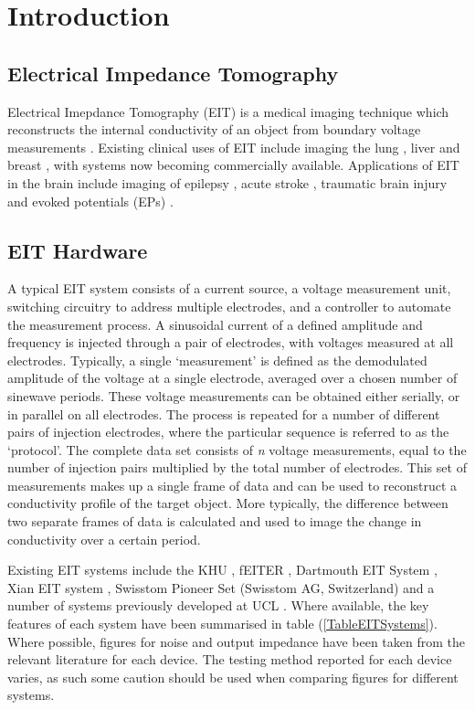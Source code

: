 \section{Introduction}

\subsection{Electrical Impedance Tomography}
Electrical Imepdance Tomography (EIT) is a medical imaging technique which reconstructs the internal conductivity of an object from boundary voltage measurements \cite{Metherall1996}. Existing clinical uses of EIT include imaging the lung \cite{Frerichs_2000}, liver \cite{YOU_2009} and breast \cite{Halter}, with systems now becoming commercially available. Applications of EIT in the brain include imaging of epilepsy \cite{Vongerichten_2016,Fabrizi_2006}, acute stroke \cite{Dowrick_2016}, traumatic brain injury \cite{Manwaring2013} and evoked potentials (EPs) \cite{Aristovich_2016}. 
\subsection{EIT Hardware}

A typical EIT system consists of a current source, a voltage measurement unit, switching circuitry to address multiple electrodes, and a controller to automate the measurement process. A sinusoidal current of a defined amplitude and frequency is injected through a pair of electrodes, with voltages measured at all electrodes. Typically, a single `measurement' is defined as the demodulated amplitude of the voltage at a single electrode, averaged over a chosen number of sinewave periods. These voltage measurements can be obtained either serially, or in parallel on all electrodes. The process is repeated for a number of different pairs of injection electrodes, where the particular sequence is referred to as the `protocol'. The complete data set consists of \emph{n} voltage measurements, equal to the number of injection pairs multiplied by the total number of electrodes. This set of measurements makes up a single frame of data and can be used to reconstruct a conductivity profile of the target object. More typically, the difference between two separate frames of data is calculated and used to image the change in conductivity over a certain period.

Existing EIT systems include the KHU \cite{Hun_Wi_2014}, fEITER \cite{McCann_2011}, Dartmouth EIT System \cite{khan}, Xian EIT system \cite{Shi_Xuetao_2005}, Swisstom Pioneer Set (Swisstom AG, Switzerland) and a number of systems previously developed at UCL \cite{Oh2011} \cite{McEwan_2006}. Where available, the key features of each system have been summarised in table (\ref{TableEITSystems}). Where possible, 
figures for noise and output impedance have been taken from the relevant literature for each device. The testing method reported for each device varies, as such some caution should be used when comparing figures for different systems.
